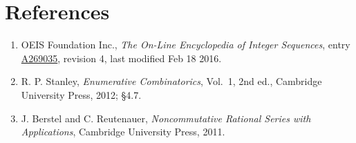 \documentclass[11pt]{article}
\theoremstyle{definition}
\begin{document}
\section{References}

\begin{enumerate}

\item OEIS Foundation Inc., \emph{The On-Line Encyclopedia of Integer Sequences}, entry \href{https://oeis.org/A269035}{A269035}, revision 4, last modified Feb 18 2016.

\item R. P. Stanley, \emph{Enumerative Combinatorics}, Vol.~1, 2nd ed., Cambridge University Press, 2012; \S4.7.

\item J. Berstel and C. Reutenauer, \emph{Noncommutative Rational Series with Applications}, Cambridge University Press, 2011.

\end{enumerate}
\end{document}
